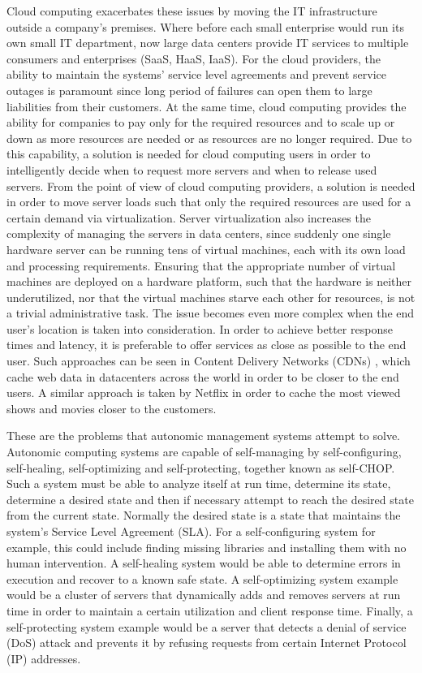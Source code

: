 Cloud computing exacerbates these issues by moving the IT infrastructure outside a company's premises. Where before each small enterprise would run its own small IT department, now large data centers provide IT services to multiple consumers and enterprises (SaaS, HaaS, IaaS). For the cloud providers, the ability to maintain the systems' service level agreements and prevent service outages is paramount since long period of failures can open them to large liabilities from their customers. At the same time, cloud computing provides the ability for companies to pay only for the required resources and to scale up or down as more resources are needed or as resources are no longer required. Due to this capability, a solution is needed for cloud computing users in order to intelligently decide when to request more servers and when to release used servers. From the point of view of cloud computing providers, a solution is needed in order to move server loads such that only the required resources are used for a certain demand via virtualization. Server virtualization also increases the complexity of managing the servers in data centers, since suddenly one single hardware server can be running tens of virtual machines, each with its own load and processing requirements. Ensuring that the appropriate number of virtual machines are deployed on a hardware platform, such that the hardware is neither underutilized, nor that the virtual machines starve each other for resources, is not a trivial administrative task. The issue becomes even more complex when the end user's location is taken into consideration. In order to achieve better response times and latency, it is preferable to offer services as close as possible to the end user. Such approaches can be seen in Content Delivery Networks (CDNs) \cite{akamai}, which cache web data in datacenters across the world in order to be closer to the end users. A similar approach is taken by Netflix in order to cache the most viewed shows and movies closer to the customers.

These are the problems that autonomic management systems attempt to solve. Autonomic computing systems are capable of self-managing by self-configuring, self-healing, self-optimizing and self-protecting, together known as self-CHOP. Such a system must be able to analyze itself at run time, determine its state, determine a desired state and then if necessary attempt to reach the desired state from the current state. Normally the desired state is a state that maintains the system's Service Level Agreement (SLA). For a self-configuring system for example, this could include finding missing libraries and installing them with no human intervention. A self-healing system would be able to determine errors in execution and recover to a known safe state. A self-optimizing system example would be a cluster of servers that dynamically adds and removes servers at run time in order to maintain a certain utilization and client response time. Finally, a self-protecting system example would be a server that detects a denial of service (DoS) attack and prevents it by refusing requests from certain Internet Protocol (IP) addresses.

